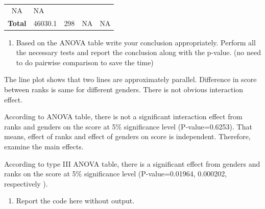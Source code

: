 \documentclass[]{article}
\providecommand{\tightlist}{%
  \setlength{\itemsep}{0pt}\setlength{\parskip}{0pt}}
\begin{document}
\begin{longtable}[]{@{}clllc@{}}
\begin{minipage}[t]{0.12\columnwidth}
NA\strut
\end{minipage} & \begin{minipage}[t]{0.14\columnwidth}\centering
NA\strut
\end{minipage}\tabularnewline
\begin{minipage}[t]{0.21\columnwidth}\centering
\textbf{Total}\strut
\end{minipage} & \begin{minipage}[t]{0.11\columnwidth}\raggedright
46030.1\strut
\end{minipage} & \begin{minipage}[t]{0.07\columnwidth}\raggedright
298\strut
\end{minipage} & \begin{minipage}[t]{0.12\columnwidth}\raggedright
NA\strut
\end{minipage} & \begin{minipage}[t]{0.14\columnwidth}\centering
NA\strut
\end{minipage}\tabularnewline
\bottomrule
\end{longtable}

\begin{enumerate}
\def\labelenumi{(\alph{enumi})}
\setcounter{enumi}{3}
\tightlist
\item
  \textcolor[rgb]{0.5,0.5,0.5}{Based on the ANOVA table write your conclusion appropriately. Perform all the necessary tests and report the conclusion along with the p-value. (no need to do pairwise comparison to save the time)}
\end{enumerate}

The line plot shows that two lines are approximately parallel.
Difference in score between ranks is same for different genders. There
is not obvious interaction effect.

According to ANOVA table, there is not a significant interaction effect
from ranks and genders on the score at 5\% significance level
(P-value=0.6253). That means, effect of ranks and effect of genders on
score is independent. Therefore, examine the main effects.

According to type III ANOVA table, there is a significant effect from
genders and ranks on the score at 5\% significance level
(P-value=0.01964, 0.000202, respectively ).

\begin{enumerate}
\def\labelenumi{(\alph{enumi})}
\setcounter{enumi}{4}
\tightlist
\item
  \textcolor[rgb]{0.5,0.5,0.5}{Report the code here without output.}
\end{enumerate}
\end{document}
